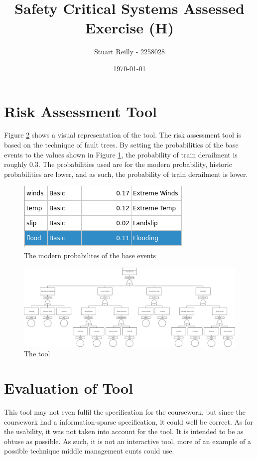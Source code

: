 \documentclass[11pt,a4]{article}
\author{Stuart Reilly - 2258028}
\title{Safety Critical Systems Assessed Exercise (H)}
\date{\today}
\begin{document}
\maketitle
\tableofcontents
{}

\pagebreak
\section{Risk Assessment Tool}
Figure \ref{fig:tool} shows a visual representation of the tool.
The risk assessment tool is based on the technique of fault trees.
By setting the probabilities of the base events to the values shown in Figure
\ref{fig:values}, the probability of train derailment is roughly $0.3$.
The probabilities used are for the modern probability, historic probabilities are
lower, and as such, the probability of train derailment is lower.

\begin{figure}[h]
	\label{fig:values}
	\includegraphics{probs}
	\caption{The modern probabilites of the base events}
\end{figure}

\begin{figure}[h]
	\label{fig:tool}
	\vspace{-2cm}
	\begin{sideways}
		\includegraphics[width=25cm]{faulttree}
	\end{sideways}
	\caption{The tool}
\end{figure}

\section{Evaluation of Tool}
This tool may not even fulfil the specification for the coursework, but since
the coursework had a information-sparse specification, it could well be correct.
As for the usability, it was not taken into account for the tool.
It is intended to be as obtuse as possible.
As such, it is not an interactive tool, more of an example of a possible technique
middle management cunts could use.
\end{document}
